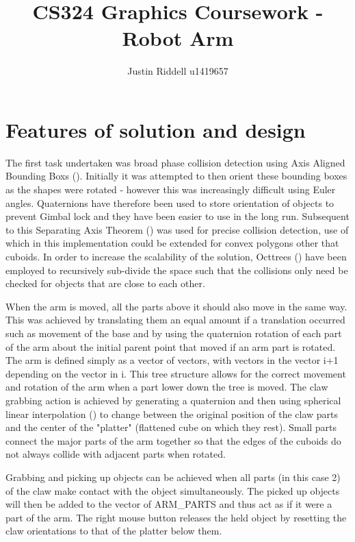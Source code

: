 \documentclass[titlepage]{article}
\title{CS324 Graphics Coursework - Robot Arm}
\author{Justin Riddell u1419657}
\begin{document}
\maketitle

\section*{Features of solution and design}

    The first task undertaken was broad phase collision detection using Axis Aligned Bounding Boxs (\cite{AABB}). Initially it was attempted to then orient these bounding boxes as the shapes were rotated - however this was increasingly difficult using Euler angles. Quaternions have therefore been used to store orientation of objects to prevent Gimbal lock and they have been easier to use in the long run. Subsequent to this Separating Axis Theorem (\cite{SAT}) was used for precise collision detection, use of which in this implementation could be extended for convex polygons other that cuboids. In order to increase the scalability of the solution, Octtrees (\cite{Octtree}) have been employed to recursively sub-divide the space such that the collisions only need be checked for objects that are close to each other.

    When the arm is moved, all the parts above it should also move in the same way. This was achieved by translating them an equal amount if a translation occurred such as movement of the base and by using the quaternion rotation of each part of the arm about the initial parent point that moved if an arm part is rotated. The arm is defined simply as a vector of vectors, with vectors in the vector i+1 depending on the vector in i. This tree structure allows for the correct movement and rotation of the arm when a part lower down the tree is moved. The claw grabbing action is achieved by generating a quaternion and then using spherical linear interpolation (\cite{SLERP}) to change between the original position of the claw parts and the center of the "platter" (flattened cube on which they rest). Small parts connect the major parts of the arm together so that the edges of the cuboids do not always collide with adjacent parts when rotated.

    Grabbing and picking up objects can be achieved when all parts (in this case 2) of the claw make contact with the object simultaneously. The picked up objects will then be added to the vector of ARM\_PARTS and thus act as if it were a part of the arm. The right mouse button releases the held object by resetting the claw orientations to that of the platter below them.
\end{document}
